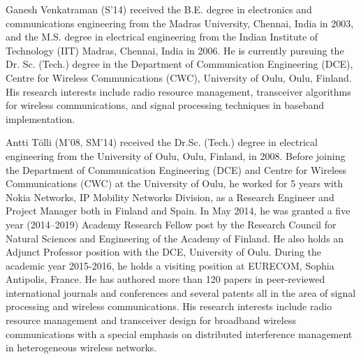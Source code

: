 \begin{IEEEbiography}{Ganesh Venkatraman}
	(S'14) received the B.E. degree in electronics and communications engineering from the Madras University, Chennai, India in 2003, and the M.S. degree in electrical engineering from the Indian Institute of Technology (IIT) Madras, Chennai, India in 2006. He is currently pursuing the Dr. Sc. (Tech.) degree in the Department of Communication Engineering (DCE), Centre for Wireless Communications (CWC), University of Oulu, Oulu, Finland. %
	His research interests include radio resource management, transceiver algorithms for wireless communications, and signal processing techniques in baseband implementation.
\end{IEEEbiography}

\begin{IEEEbiography}{Antti T\"olli}
(M'08, SM'14) received the Dr.Sc. (Tech.) degree in electrical engineering from the University of Oulu, Oulu, Finland, in 2008. Before joining the Department of Communication Engineering (DCE) and Centre for Wireless Communications (CWC) at the University of Oulu, he worked for 5 years with Nokia Networks, IP Mobility Networks Division, as a Research Engineer and Project Manager both in Finland and Spain. In May 2014, he was granted a five year (2014--2019) Academy Research Fellow post by the Research Council for Natural Sciences and Engineering of the Academy of Finland. He also holds an Adjunct Professor position with the DCE, University of Oulu. During the academic year 2015-2016, he holds a visiting position at EURECOM, Sophia Antipolis, France. He has authored more than 120 papers in peer-reviewed international journals and conferences and several patents all in the area
of signal processing and wireless communications. His research interests include radio resource management and transceiver design for broadband wireless communications with a special emphasis on distributed interference management in heterogeneous wireless networks. 
\end{IEEEbiography}


